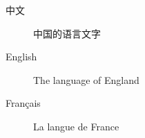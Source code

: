 \documentclass[nofonts]{ctexart}
\begin{document}
\begin{description}
	\item[中文] 中国的语言文字
	\item[English] The language of England
	\item[Fran\c{c}ais] La langue de France
\end{description}
\end{document}
